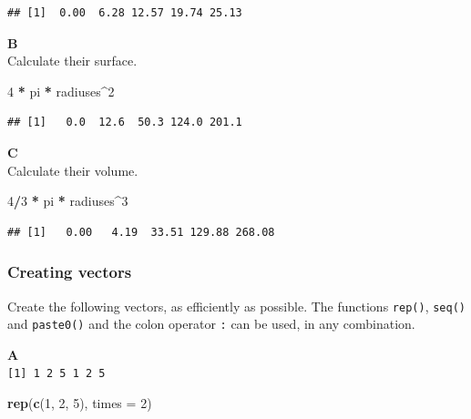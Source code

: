 \documentclass[]{book}
\newenvironment{Shaded}{\begin{snugshade}}{\end{snugshade}}
\newcommand{\DataTypeTok}[1]{\textcolor[rgb]{0.13,0.29,0.53}{#1}}
\newcommand{\DecValTok}[1]{\textcolor[rgb]{0.00,0.00,0.81}{#1}}
\newcommand{\KeywordTok}[1]{\textcolor[rgb]{0.13,0.29,0.53}{\textbf{#1}}}
\newcommand{\NormalTok}[1]{#1}
\newcommand{\OperatorTok}[1]{\textcolor[rgb]{0.81,0.36,0.00}{\textbf{#1}}}
\newcommand{\StringTok}[1]{\textcolor[rgb]{0.31,0.60,0.02}{#1}}
\begin{document}
\begin{verbatim}
## [1]  0.00  6.28 12.57 19.74 25.13
\end{verbatim}

\textbf{B}\\
Calculate their surface.

\begin{Shaded}
\begin{Highlighting}[]
\DecValTok{4} \OperatorTok{*}\StringTok{ }\NormalTok{pi }\OperatorTok{*}\StringTok{ }\NormalTok{radiuses}\OperatorTok{^}\DecValTok{2}
\end{Highlighting}
\end{Shaded}

\begin{verbatim}
## [1]   0.0  12.6  50.3 124.0 201.1
\end{verbatim}

\textbf{C}\\
Calculate their volume.

\begin{Shaded}
\begin{Highlighting}[]
\DecValTok{4}\OperatorTok{/}\DecValTok{3} \OperatorTok{*}\StringTok{ }\NormalTok{pi }\OperatorTok{*}\StringTok{ }\NormalTok{radiuses}\OperatorTok{^}\DecValTok{3}
\end{Highlighting}
\end{Shaded}

\begin{verbatim}
## [1]   0.00   4.19  33.51 129.88 268.08
\end{verbatim}

\hypertarget{creating-vectors-2}{%
\subsubsection*{Creating vectors}\label{creating-vectors-2}}

Create the following vectors, as efficiently as possible. The functions \texttt{rep()}, \texttt{seq()} and \texttt{paste0()} and the colon operator \texttt{:} can be used, in any combination.

\textbf{A}\\
\texttt{{[}1{]}\ 1\ 2\ 5\ 1\ 2\ 5}

\begin{Shaded}
\begin{Highlighting}[]
\KeywordTok{rep}\NormalTok{(}\KeywordTok{c}\NormalTok{(}\DecValTok{1}\NormalTok{, }\DecValTok{2}\NormalTok{, }\DecValTok{5}\NormalTok{), }\DataTypeTok{times =} \DecValTok{2}\NormalTok{)}
\end{Highlighting}
\end{Shaded}
\end{document}
